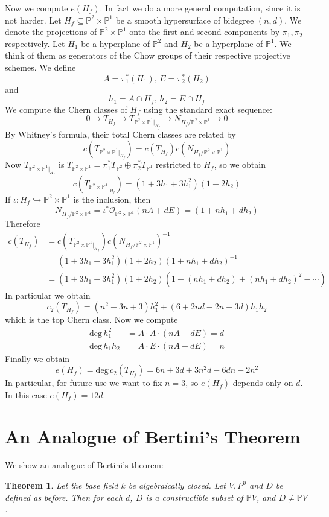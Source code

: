 \documentclass[12pt]{article}
\theoremstyle{plain}
\newtheorem{theorem}[equation]{Theorem}
\theoremstyle{definition}
\newcommand{\IP}{\mathbb{P}}
\newcommand{\sO}{\mathcal{O}}
\renewcommand{\deg}{\mathrm{deg}\,}
\newcommand{\<}{\langle}
\renewcommand{\>}{\rangle}
\newcommand{\into}{\hookrightarrow}
\begin{document}
Now we compute $e(H_f)$. In fact we do a more general computation, since it is not harder. Let $H_f \subseteq \IP^2 \times \IP^1$ be a smooth hypersurface of bidegree $(n, d)$. We denote the projections of $\IP^2 \times \IP^1$ onto the first and second components by $\pi_1, \pi_2$ respectively. Let $H_1$ be a hyperplane of $\IP^2$ and $H_2$ be a hyperplane of $\IP^1$. We think of them as generators of the Chow groups of their respective projective schemes. We define 
$$ A = \pi_1^*(H_1), \, E = \pi_2^*(H_2) $$
and $$ h_1 = A \cap H_f, \, h_2 = E \cap H_f $$
We compute the Chern classes of $H_f$ using the standard exact sequence:
$$ 0 \to T_{H_f} \to T_{\IP^2 \times \IP^1|_{H_f}} \to N_{H_f/\IP^2 \times \IP^1} \to 0$$
By Whitney\rq{}s formula, their total Chern classes are related by
$$ c(T_{\IP^2 \times \IP^1|_{H_f}}) = c(T_{H_f}) c(N_{H_f/\IP^2 \times \IP^1}) $$
Now $T_{\IP^2 \times \IP^1|_{H_f}}$ is $T_{\IP^2 \times \IP^1} = \pi_1^* T_{\IP^2} \oplus \pi_2^* T_{\IP^1}$ restricted to $H_f$, so we obtain 
$$ c(T_{\IP^2 \times \IP^1|_{H_f}}) = (1 + 3h_1 + 3h_1^2)(1 + 2h_2) $$
If $\iota : H_f \into \IP^2 \times \IP^1$ is the inclusion, then $$N_{H_f/\IP^2 \times \IP^1} = \iota^* \sO_{\IP^2 \times \IP^1}(nA  + dE) = (1 + nh_1 + dh_2)$$
Therefore 
\begin{align*}
c(T_{H_f}) &= c(T_{\IP^2 \times \IP^1|_{H_f}})c(N_{H_f/\IP^2 \times \IP^1})^{-1}\\
&= (1 + 3h_1 + 3h_1^2)(1 + 2h_2)(1 + nh_1 + dh_2)^{-1}\\
&= (1 + 3h_1 + 3h_1^2)(1 + 2h_2)(1 - (nh_1 + dh_2) + (nh_1 + dh_2)^2 - \cdots)
\end{align*}
In particular we obtain 
$$ c_2(T_{H_f}) = (n^2 - 3n + 3)h_1^2 + (6 + 2nd - 2n - 3d)h_1 h_2 $$
which is the top Chern class. Now we compute 
\begin{align*}
\deg h_1^2 &= A \cdot A \cdot (nA + dE) = d \\
\deg h_1 h_2 &= A \cdot E \cdot (nA + dE) = n 
\end{align*}
Finally we obtain 
$$ e(H_f) = \deg c_2(T_{H_f}) = 6n + 3d + 3n^2 d - 6 dn - 2n^2 $$
In particular, for future use we want to fix $n = 3$, so $e(H_f)$ depends only on $d$. In this case $e(H_f) = 12 d$.  

\section{An Analogue of Bertini\rq{}s Theorem}
We show an analogue of Bertini's theorem: 
\begin{theorem}
\label{Bertini}
Let the base field $k$ be algebraically closed. Let $V, P^0$ and $D$ be defined as before. Then for each $d$, $D$ is a constructible subset of $\IP V$, and $D \neq \IP V$. 
\end{theorem}
\end{document}

